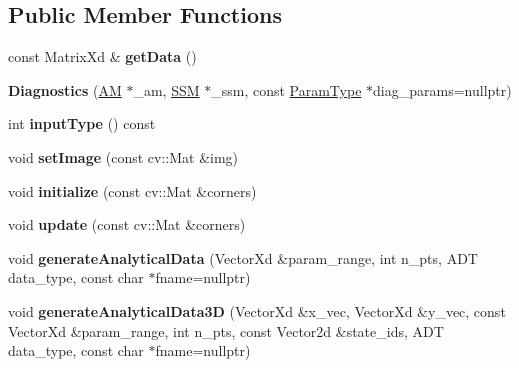 \subsection*{Public Member Functions}
\begin{DoxyCompactItemize}
\item 
\hypertarget{classDiagnostics_a0a57a2e983c529eb2113a537101a932d}{const Matrix\-Xd \& {\bfseries get\-Data} ()}\label{classDiagnostics_a0a57a2e983c529eb2113a537101a932d}

\item 
\hypertarget{classDiagnostics_abd2d8842d4f8ac0ceac08a95aa3859d1}{{\bfseries Diagnostics} (\hyperlink{classAppearanceModel}{A\-M} $\ast$\-\_\-am, \hyperlink{classStateSpaceModel}{S\-S\-M} $\ast$\-\_\-ssm, const \hyperlink{structDiagnosticsParams}{Param\-Type} $\ast$diag\-\_\-params=nullptr)}\label{classDiagnostics_abd2d8842d4f8ac0ceac08a95aa3859d1}

\item 
\hypertarget{classDiagnostics_a14df56879f2201ac635cdfd78f83007f}{int {\bfseries input\-Type} () const }\label{classDiagnostics_a14df56879f2201ac635cdfd78f83007f}

\item 
\hypertarget{classDiagnostics_a41e939e1d3f1928bb1b4f9b8b0082f1f}{void {\bfseries set\-Image} (const cv\-::\-Mat \&img)}\label{classDiagnostics_a41e939e1d3f1928bb1b4f9b8b0082f1f}

\item 
\hypertarget{classDiagnostics_a995b4956646986d22a3d9ae943e126bc}{void {\bfseries initialize} (const cv\-::\-Mat \&corners)}\label{classDiagnostics_a995b4956646986d22a3d9ae943e126bc}

\item 
\hypertarget{classDiagnostics_a534f0a7cb24b2593f3a6bcb646e33199}{void {\bfseries update} (const cv\-::\-Mat \&corners)}\label{classDiagnostics_a534f0a7cb24b2593f3a6bcb646e33199}

\item 
\hypertarget{classDiagnostics_afb2b5c2cbc835a92aca06726e0a881bb}{void {\bfseries generate\-Analytical\-Data} (Vector\-Xd \&param\-\_\-range, int n\-\_\-pts, A\-D\-T data\-\_\-type, const char $\ast$fname=nullptr)}\label{classDiagnostics_afb2b5c2cbc835a92aca06726e0a881bb}

\item 
\hypertarget{classDiagnostics_afad7cb1263188f6430f352a82c830b6c}{void {\bfseries generate\-Analytical\-Data3\-D} (Vector\-Xd \&x\-\_\-vec, Vector\-Xd \&y\-\_\-vec, const Vector\-Xd \&param\-\_\-range, int n\-\_\-pts, const Vector2d \&state\-\_\-ids, A\-D\-T data\-\_\-type, const char $\ast$fname=nullptr)}\label{classDiagnostics_afad7cb1263188f6430f352a82c830b6c}


\end{DoxyCompactItemize}
